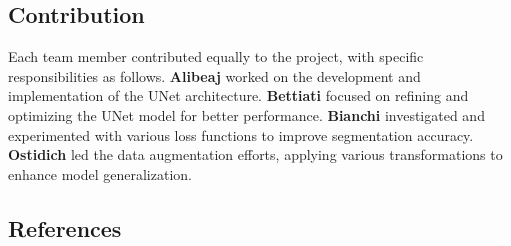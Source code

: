 \documentclass[11pt]{article}
\begin{document}
\begin{multicols}{2}
        \subsection{Contribution}

        Each team member contributed equally to the project, with specific responsibilities as follows. \textbf{Alibeaj} worked on the development and implementation of the UNet architecture. \textbf{Bettiati} focused on refining and optimizing the UNet model for better performance. \textbf{Bianchi} investigated and experimented with various loss functions to improve segmentation accuracy. \textbf{Ostidich} led the data augmentation efforts, applying various transformations to enhance model generalization.

        \subsection{References}

    
    \end{multicols}
\end{document}

